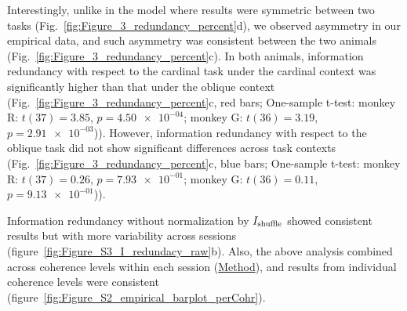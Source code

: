 \documentclass[lineno,pdflatex,sn-basic]{sn-jnl}%
\newcommand{\Is}{I_{\rm shuffle}}
\newcommand{\Ir}{I_{\rm real}} %
\newcommand{\Icross}{I_{\rm cross}}
\theoremstyle{thmstyleone}%
\theoremstyle{thmstyletwo}%
\theoremstyle{thmstylethree}%
\begin{document}
Interestingly, unlike in the model where results were symmetric between two tasks (Fig.~\ref{fig:Figure_3_redundancy_percent}d), we observed asymmetry in our empirical data, and such asymmetry was consistent between the two animals (Fig.~\ref{fig:Figure_3_redundancy_percent}c). In both animals, information redundancy with respect to the cardinal task under the cardinal context was significantly higher than that under the oblique context (Fig.~\ref{fig:Figure_3_redundancy_percent}c, red bars; One-sample t-test: monkey R: $t(37) = 3.85$, $p = \num{4.50e-04}$; monkey G:  $t(36) = 3.19$, $p = \num{2.91e-03}$)). However, information redundancy with respect to the oblique task did not show significant differences across task contexts (Fig.~\ref{fig:Figure_3_redundancy_percent}c, blue bars; One-sample t-test: monkey R: $t(37) = 0.26$, $p = \num{7.93e-01}$; monkey G:  $t(36) = 0.11$, $p = \num{9.13e-01}$)).

Information redundancy without normalization by $\Is$ showed consistent results but with more variability across sessions (figure~\ref{fig:Figure_S3_I_redundacy_raw}b). Also, the above analysis combined across coherence levels within each session (\hyperref[sec_ch2:cross_fisher]{Method}), and results from individual coherence levels were consistent (figure~\ref{fig:Figure_S2_empirical_barplot_perCohr}).

\end{document}
